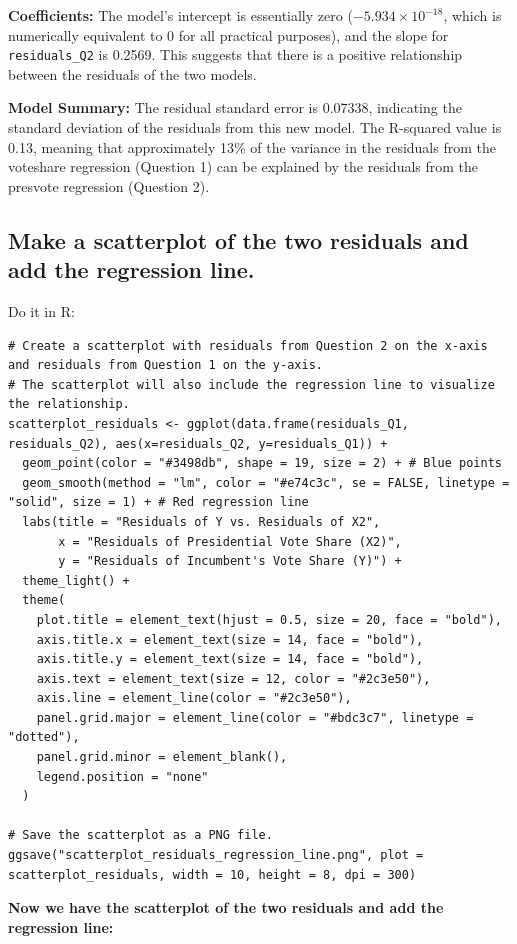 \documentclass[12pt]{article}
\begin{document}
\textbf{Coefficients:} The model's intercept is essentially zero ($-5.934 \times 10^{-18}$, which is numerically equivalent to 0 for all practical purposes), and the slope for \texttt{residuals\_Q2} is 0.2569. This suggests that there is a positive relationship between the residuals of the two models.

\textbf{Model Summary:} The residual standard error is 0.07338, indicating the standard deviation of the residuals from this new model. The R-squared value is 0.13, meaning that approximately 13\% of the variance in the residuals from the voteshare regression (Question 1) can be explained by the residuals from the presvote regression (Question 2).

\subsection{Make a scatterplot of the two residuals and add the regression line.}
Do it in R:
\begin{lstlisting}
# Create a scatterplot with residuals from Question 2 on the x-axis and residuals from Question 1 on the y-axis.
# The scatterplot will also include the regression line to visualize the relationship.
scatterplot_residuals <- ggplot(data.frame(residuals_Q1, residuals_Q2), aes(x=residuals_Q2, y=residuals_Q1)) +
  geom_point(color = "#3498db", shape = 19, size = 2) + # Blue points
  geom_smooth(method = "lm", color = "#e74c3c", se = FALSE, linetype = "solid", size = 1) + # Red regression line
  labs(title = "Residuals of Y vs. Residuals of X2",
       x = "Residuals of Presidential Vote Share (X2)",
       y = "Residuals of Incumbent's Vote Share (Y)") +
  theme_light() +
  theme(
    plot.title = element_text(hjust = 0.5, size = 20, face = "bold"),
    axis.title.x = element_text(size = 14, face = "bold"),
    axis.title.y = element_text(size = 14, face = "bold"),
    axis.text = element_text(size = 12, color = "#2c3e50"),
    axis.line = element_line(color = "#2c3e50"),
    panel.grid.major = element_line(color = "#bdc3c7", linetype = "dotted"),
    panel.grid.minor = element_blank(),
    legend.position = "none"
  )

# Save the scatterplot as a PNG file.
ggsave("scatterplot_residuals_regression_line.png", plot = scatterplot_residuals, width = 10, height = 8, dpi = 300)
\end{lstlisting}
\textbf{Now we have the scatterplot of the two residuals and add the regression line:}
\end{document}
